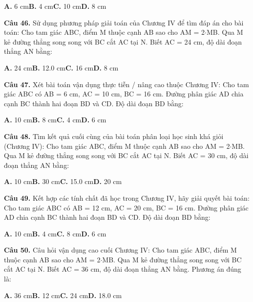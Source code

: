 \documentclass[11pt,a4paper]{article}
\begin{document}
\hspace*{1.5em}\textbf{A.} 6 cm\quad\quad \textbf{B.} 4 cm\quad\quad \textbf{C.} 10 cm\quad\quad \textbf{D.} 8 cm\par\vspace{2pt}
\textbf{\color{primary} Câu 46.} Sử dụng phương pháp giải toán của Chương IV để tìm đáp án cho bài toán: Cho tam giác ABC, điểm M thuộc cạnh AB sao cho AM = 2$\cdot$MB. Qua M kẻ đường thẳng song song với BC cắt AC tại N. Biết AC = 24 cm, độ dài đoạn thẳng AN bằng:\par
\hspace*{1.5em}\textbf{A.} 24 cm\quad\quad \textbf{B.} 12.0 cm\quad\quad \textbf{C.} 16 cm\quad\quad \textbf{D.} 8 cm\par\vspace{2pt}
\textbf{\color{primary} Câu 47.} Xét bài toán vận dụng thực tiễn / nâng cao thuộc Chương IV: Cho tam giác ABC có AB = 6 cm, AC = 10 cm, BC = 16 cm. Đường phân giác AD chia cạnh BC thành hai đoạn BD và CD. Độ dài đoạn BD bằng:\par
\hspace*{1.5em}\textbf{A.} 10 cm\quad\quad \textbf{B.} 8 cm\quad\quad \textbf{C.} 4 cm\quad\quad \textbf{D.} 6 cm\par\vspace{2pt}
\textbf{\color{primary} Câu 48.} Tìm kết quả cuối cùng của bài toán phân loại học sinh khá giỏi (Chương IV): Cho tam giác ABC, điểm M thuộc cạnh AB sao cho AM = 2$\cdot$MB. Qua M kẻ đường thẳng song song với BC cắt AC tại N. Biết AC = 30 cm, độ dài đoạn thẳng AN bằng:\par
\hspace*{1.5em}\textbf{A.} 10 cm\quad\quad \textbf{B.} 30 cm\quad\quad \textbf{C.} 15.0 cm\quad\quad \textbf{D.} 20 cm\par\vspace{2pt}
\textbf{\color{primary} Câu 49.} Kết hợp các tính chất đã học trong Chương IV, hãy giải quyết bài toán: Cho tam giác ABC có AB = 12 cm, AC = 20 cm, BC = 16 cm. Đường phân giác AD chia cạnh BC thành hai đoạn BD và CD. Độ dài đoạn BD bằng:\par
\hspace*{1.5em}\textbf{A.} 10 cm\quad\quad \textbf{B.} 4 cm\quad\quad \textbf{C.} 8 cm\quad\quad \textbf{D.} 6 cm\par\vspace{2pt}
\textbf{\color{primary} Câu 50.} Câu hỏi vận dụng cao cuối Chương IV: Cho tam giác ABC, điểm M thuộc cạnh AB sao cho AM = 2$\cdot$MB. Qua M kẻ đường thẳng song song với BC cắt AC tại N. Biết AC = 36 cm, độ dài đoạn thẳng AN bằng. Phương án đúng là:\par
\hspace*{1.5em}\textbf{A.} 36 cm\quad\quad \textbf{B.} 12 cm\quad\quad \textbf{C.} 24 cm\quad\quad \textbf{D.} 18.0 cm\par\vspace{2pt}
\end{document}
